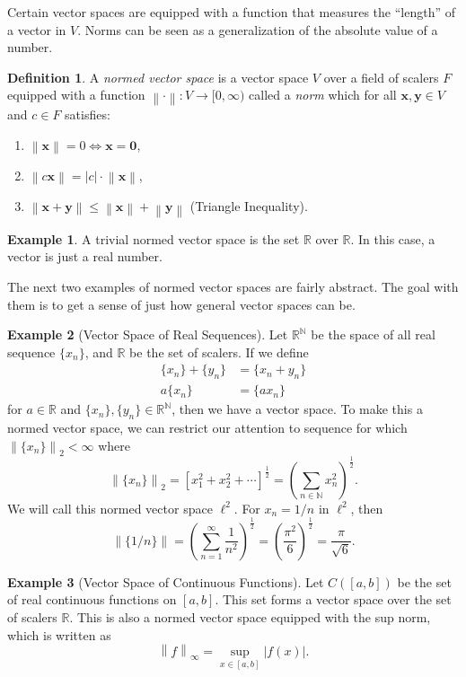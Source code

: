 \documentclass{article}
\newcommand{\N}{\mathbb{N}}
\newcommand{\R}{\mathbb{R}}
\newcommand{\x}{\mathbf{x}}
\newcommand{\y}{\mathbf{y}}
\newcommand{\ze}{\mathbf{0}}
\newcommand{\norm}[1]{\left\lVert#1\right\rVert}
\theoremstyle{definition}
\newtheorem{definition}{Definition}[section]
\newtheorem{example}{Example}[section]
\begin{document}
Certain vector spaces are equipped with a function that measures the ``length'' of a vector in $ V $. Norms can be seen as a generalization of the absolute value of a number.
\begin{definition}
	A \textit{\color{red}normed vector space} is a vector space $ V $ over a field of scalers $ F $ equipped with a function $\norm{\cdot}:V\to[0,\infty)$ called a \textit{\color{red}norm} which for all $ \x,\y\in V $ and $ c\in F $ satisfies:
	\begin{enumerate}
		\item $ \norm{\x}=0\iff \x=\ze$,
		\item $ \norm{c\x}=|c|\cdot \norm{\x} $,
		\item $ \norm{\x+\y}\le\norm{\x}+\norm{\y} $ (Triangle Inequality).
	\end{enumerate} 
\end{definition}
\begin{example}
	A trivial normed vector space is the set $ \R $ over $ \R $. In this case, a vector is just a real number. 
\end{example}
The next two examples of normed vector spaces are fairly abstract. The goal with them is to get a sense of just how general vector spaces can be.
\begin{example}[Vector Space of Real Sequences]
	Let $ \R^\N $ be the space of all real sequence $ \{x_n\} $, and $ \R $ be the set of scalers. If we define \begin{align*}
		\{x_n\}+\{y_n\}&=\{x_n+y_n\}\\
		a\{x_n\}&=\{ax_n \}
	\end{align*}
	for $ a\in\R $ and $ \{x_n\},\{y_n\}\in\R^\N $, then we have a vector space. To make this a normed vector space, we can restrict our attention to sequence for which $ \norm{\{x_n\}}_2<\infty $ where $$ \norm{\{x_n\}}_2=\left[x_1^2+x_2^2+\cdots\right]^\frac{1}{2}=\left(\sum_{n\in\N}x_n^2\right)^\frac{1}{2}.$$  We will call this normed vector space $ \ell^2 $. For $ x_n=1/n $ in $ \ell^2 $, then $$\norm{\{1/n\}}=\left(\sum_{n=1}^\infty\frac{1}{n^2}\right)^\frac{1}{2}=\left(\frac{\pi^2}{6}\right)^\frac{1}{2}=\frac{\pi}{\sqrt{6}} .$$ 
\end{example}
\begin{example}[Vector Space of Continuous Functions]
	Let $ C([a,b]) $ be the set of real continuous functions on $ [a,b] $. This set forms a vector space over the set of scalers $ \R $. This is also a normed vector space equipped with the sup norm, which is written as $$\norm{f}_\infty=\sup_{x\in [a,b]}|f(x)| .$$
\end{example}
\end{document}
